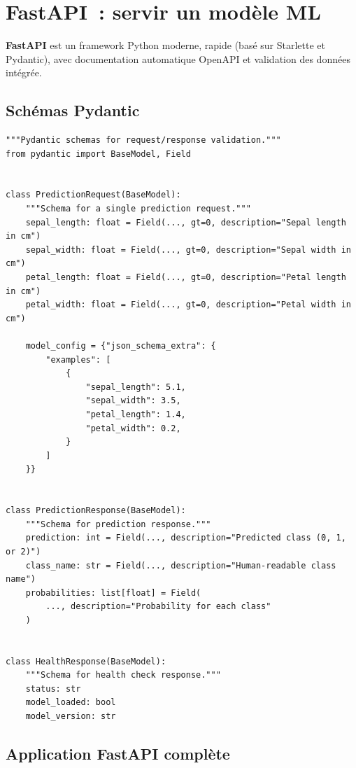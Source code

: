 \section{FastAPI~: servir un mod\`ele ML}
\label{sec:fastapi}

\textbf{FastAPI} est un framework Python moderne, rapide
(bas\'e sur Starlette et Pydantic), avec documentation automatique OpenAPI
et validation des donn\'ees int\'egr\'ee.

\subsection{Sch\'emas Pydantic}

\begin{codeblock}[title=\textbf{schemas.py --- Sch\'emas de requ\^ete et r\'eponse}]
\begin{verbatim}
"""Pydantic schemas for request/response validation."""
from pydantic import BaseModel, Field


class PredictionRequest(BaseModel):
    """Schema for a single prediction request."""
    sepal_length: float = Field(..., gt=0, description="Sepal length in cm")
    sepal_width: float = Field(..., gt=0, description="Sepal width in cm")
    petal_length: float = Field(..., gt=0, description="Petal length in cm")
    petal_width: float = Field(..., gt=0, description="Petal width in cm")

    model_config = {"json_schema_extra": {
        "examples": [
            {
                "sepal_length": 5.1,
                "sepal_width": 3.5,
                "petal_length": 1.4,
                "petal_width": 0.2,
            }
        ]
    }}


class PredictionResponse(BaseModel):
    """Schema for prediction response."""
    prediction: int = Field(..., description="Predicted class (0, 1, or 2)")
    class_name: str = Field(..., description="Human-readable class name")
    probabilities: list[float] = Field(
        ..., description="Probability for each class"
    )


class HealthResponse(BaseModel):
    """Schema for health check response."""
    status: str
    model_loaded: bool
    model_version: str
\end{verbatim}
\end{codeblock}

\subsection{Application FastAPI compl\`ete}


